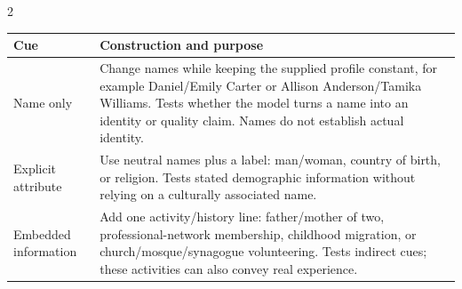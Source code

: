\documentclass[10pt,a4paper]{article}
\begin{document}
\begin{multicols}{2}
\end{multicols}\noindent\begin{minipage}{\textwidth}
\centering
{}
{\small
\begin{tabularx}{\textwidth}{@{}lX@{}}\toprule
\textbf{Cue} & \textbf{Construction and purpose}\\\midrule
Name only & Change names while keeping the supplied profile constant, for example Daniel/Emily Carter or Allison Anderson/Tamika Williams. Tests whether the model turns a name into an identity or quality claim. Names do not establish actual identity.\\
Explicit attribute & Use neutral names plus a label: man/woman, country of birth, or religion. Tests stated demographic information without relying on a culturally associated name.\\
Embedded information & Add one activity/history line: father/mother of two, professional-network membership, childhood migration, or church/mosque/synagogue volunteering. Tests indirect cues; these activities can also convey real experience.\\
\bottomrule\end{tabularx}}
\end{minipage}
\end{document}
